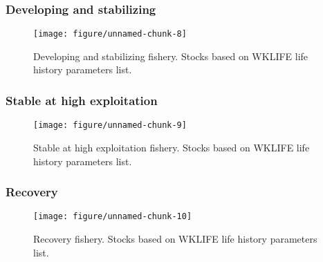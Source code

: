 \documentclass[a4paper]{article}\usepackage{graphicx, color}
\makeatletter
\def\maxwidth{ %
  \ifdim\Gin@nat@width>\linewidth
    \linewidth
  \else
    \Gin@nat@width
  \fi
}
\newenvironment{knitrout}{}{} %
\makeatother
\begin{document}
\subsubsection*{Developing and stabilizing}
\begin{knitrout}
\color{fgcolor}\begin{figure}[H]


{\centering \texttt{[image: figure/unnamed-chunk-8]} 

}

\caption[Developing and stabilizing fishery]{Developing and stabilizing fishery. Stocks based on WKLIFE life history parameters list.\label{fig:unnamed-chunk-8}}
\end{figure}

\end{knitrout}


\subsubsection*{Stable at high exploitation}
\begin{knitrout}
\color{fgcolor}\begin{figure}[H]


{\centering \texttt{[image: figure/unnamed-chunk-9]} 

}

\caption[Stable at high exploitation fishery]{Stable at high exploitation fishery. Stocks based on WKLIFE life history parameters list.\label{fig:unnamed-chunk-9}}
\end{figure}

\end{knitrout}


\subsubsection*{Recovery}
\begin{knitrout}
\color{fgcolor}\begin{figure}[H]


{\centering \texttt{[image: figure/unnamed-chunk-10]} 

}

\caption[Recovery fishery]{Recovery fishery. Stocks based on WKLIFE life history parameters list.\label{fig:unnamed-chunk-10}}
\end{figure}

\end{knitrout}
\end{document}
